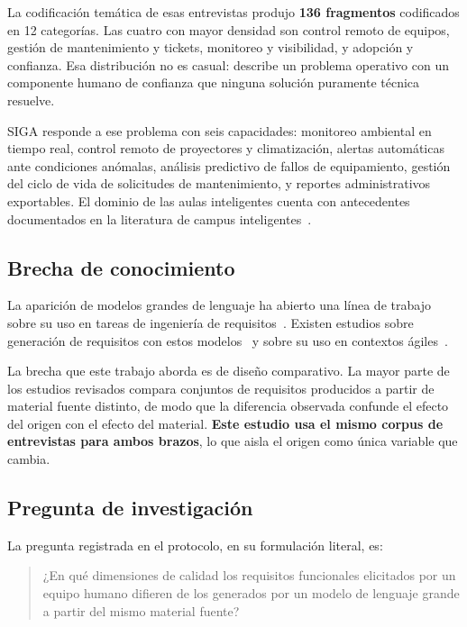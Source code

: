 \documentclass[11pt,a4paper]{article}
\begin{document}
La codificaci\'on tem\'atica de esas entrevistas produjo \textbf{136 fragmentos}
codificados en 12 categor\'ias. Las cuatro con mayor densidad son control remoto de equipos, gesti\'on
de mantenimiento y tickets, monitoreo y visibilidad, y adopci\'on y confianza. Esa
distribuci\'on no es casual: describe un problema operativo con un componente humano de
confianza que ninguna soluci\'on puramente t\'ecnica resuelve.

SIGA responde a ese problema con seis capacidades: monitoreo ambiental en tiempo real,
control remoto de proyectores y climatizaci\'on, alertas autom\'aticas ante condiciones
an\'omalas, an\'alisis predictivo de fallos de equipamiento, gesti\'on del ciclo de vida
de solicitudes de mantenimiento, y reportes administrativos exportables. El dominio de
las aulas inteligentes cuenta con antecedentes documentados en la literatura de campus
inteligentes~\cite{polin2023smartcampus,zhang2024smartclassrooms,kurni2025iot}.

\subsection{Brecha de conocimiento}

La aparici\'on de modelos grandes de lenguaje ha abierto una l\'inea de trabajo sobre su
uso en tareas de ingenier\'ia de requisitos~\cite{arora2024advancing,cheng2026genai,%
vogelsang2024using}. Existen estudios sobre generaci\'on de requisitos con estos
modelos~\cite{ronanki2023investigating,gorer2023generating,almeida2025elicitation} y
sobre su uso en contextos \'agiles~\cite{ray2023agile,ronanki2023chatgpt}.

La brecha que este trabajo aborda es de dise\~no comparativo. La mayor parte de los
estudios revisados compara conjuntos de requisitos producidos a partir de material
fuente distinto, de modo que la diferencia observada confunde el efecto del origen con
el efecto del material. \textbf{Este estudio usa el mismo corpus de entrevistas para ambos
brazos}, lo que aisla el origen como \'unica variable que cambia.

\subsection{Pregunta de investigaci\'on}

La pregunta registrada en el protocolo, en su formulaci\'on literal, es:

\begin{quote}
¿En qu\'e dimensiones de calidad los requisitos funcionales elicitados por un equipo
humano difieren de los generados por un modelo de lenguaje grande a partir del mismo
material fuente?
\end{quote}
\end{document}
